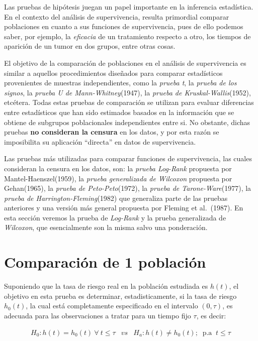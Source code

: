 \documentclass[
  a4paper,
  oneside,
  openany]{book}
\begin{document}
Las pruebas de hipótesis juegan un papel importante en la inferencia estadística. En el contexto del análisis de supervivencia, resulta primordial comparar poblaciones en cuanto a sus funciones de supervivencia, pues de ello podemos saber, por ejemplo, la \emph{eficacia} de un tratamiento respecto a otro, los tiempos de aparición de un tumor en dos grupos, entre otras cosas.

El objetivo de la comparación de poblaciones en el análisis de supervivencia es similar a aquellos procedimientos diseñados para comparar estadísticos provenientes de muestras independientes, como la \emph{prueba t}, la \emph{prueba de los signos}, la \emph{prueba U de Mann-Whitney}(1947), la \emph{prueba de Kruskal-Wallis}(1952), etcétera. Todas estas pruebas de comparación se utilizan para evaluar diferencias entre estadísticos que han sido estimados basados en la información que se obtiene de subgrupos poblacionales independientes entre si. No obstante, dichas pruebas \textbf{no consideran la censura} en los datos, y por esta razón se imposibilita su aplicación ``directa'' en datos de supervivencia.

Las pruebas más utilizadas para comparar funciones de supervivencia, las cuales consideran la censura en los datos, son: la \emph{prueba Log-Rank} propuesta por Mantel-Haenszel(1959), la \emph{prueba generalizada de Wilcoxon} propuesta por Gehan(1965), la \emph{prueba de Peto-Peto}(1972), la \emph{prueba de Tarone-Ware}(1977), la \emph{prueba de Harrington-Fleming}(1982) que generaliza parte de las pruebas anteriores y una versión más general propuesta por Fleming et al.~(1987). En esta sección veremos la prueba de \emph{Log-Rank} y la prueba generalizada de \emph{Wilcoxon}, que esencialmente son la misma salvo una ponderación.

\hypertarget{comparaciuxf3n-de-1-poblaciuxf3n}{%
\section{Comparación de 1 población}\label{comparaciuxf3n-de-1-poblaciuxf3n}}

Suponiendo que la tasa de riesgo real en la población estudiada es \(h(t)\), el objetivo en esta prueba es determinar, estadisticamente, si la tasa de riesgo \(h_0(t)\), la cual está completamente especificado en el intervalo \((0,\tau)\), es adecuada para las observaciones a tratar para un tiempo fijo \(\tau\), es decir:

\[
\begin{array}{ccc}
H_0:h(t) = h_0(t)\ \forall \ t\leq \tau&vs& H_a:h(t) \neq h_0(t);\ \mbox{ p.a } \ t\leq \tau
\end{array}
\]
\end{document}
